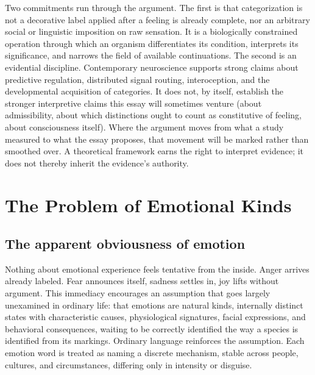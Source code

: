 \documentclass[11pt]{article}
\begin{document}
Two commitments run through the argument. The first is that categorization is not a decorative label applied after a feeling is already complete, nor an arbitrary social or linguistic imposition on raw sensation. It is a biologically constrained operation through which an organism differentiates its condition, interprets its significance, and narrows the field of available continuations. The second is an evidential discipline. Contemporary neuroscience supports strong claims about predictive regulation, distributed signal routing, interoception, and the developmental acquisition of categories. It does not, by itself, establish the stronger interpretive claims this essay will sometimes venture (about admissibility, about which distinctions ought to count as constitutive of feeling, about consciousness itself). Where the argument moves from what a study measured to what the essay proposes, that movement will be marked rather than smoothed over. A theoretical framework earns the right to interpret evidence; it does not thereby inherit the evidence's authority.

\section{The Problem of Emotional Kinds}\label{sec:kinds}

\subsection{The apparent obviousness of emotion}

Nothing about emotional experience feels tentative from the inside. Anger arrives already labeled. Fear announces itself, sadness settles in, joy lifts without argument. This immediacy encourages an assumption that goes largely unexamined in ordinary life: that emotions are natural kinds, internally distinct states with characteristic causes, physiological signatures, facial expressions, and behavioral consequences, waiting to be correctly identified the way a species is identified from its markings. Ordinary language reinforces the assumption. Each emotion word is treated as naming a discrete mechanism, stable across people, cultures, and circumstances, differing only in intensity or disguise.
\end{document}
